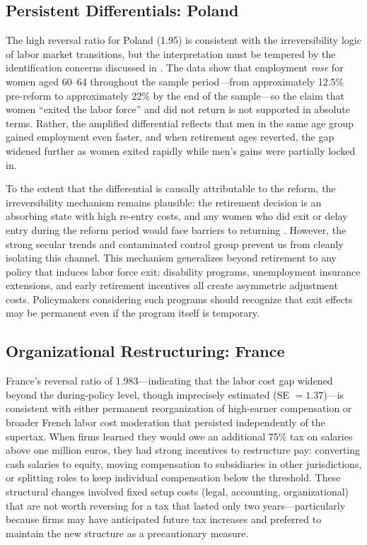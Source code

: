 \documentclass[12pt]{article}
\begin{document}
\subsection{Persistent Differentials: Poland}

The high reversal ratio for Poland (1.95) is consistent with the irreversibility logic of labor market transitions, but the interpretation must be tempered by the identification concerns discussed in . The data show that employment \textit{rose} for women aged 60--64 throughout the sample period---from approximately 12.5\% pre-reform to approximately 22\% by the end of the sample---so the claim that women ``exited the labor force'' and did not return is not supported in absolute terms. Rather, the amplified differential reflects that men in the same age group gained employment even faster, and when retirement ages reverted, the gap widened further as women exited rapidly while men's gains were partially locked in.

To the extent that the differential is causally attributable to the reform, the irreversibility mechanism remains plausible: the retirement decision is an absorbing state with high re-entry costs, and any women who did exit or delay entry during the reform period would face barriers to returning \citep{autor2003rise, staubli2013does}. However, the strong secular trends and contaminated control group prevent us from cleanly isolating this channel. This mechanism generalizes beyond retirement to any policy that induces labor force exit: disability programs, unemployment insurance extensions, and early retirement incentives all create asymmetric adjustment costs. Policymakers considering such programs should recognize that exit effects may be permanent even if the program itself is temporary.

\subsection{Organizational Restructuring: France}

France's reversal ratio of 1.983---indicating that the labor cost gap widened beyond the during-policy level, though imprecisely estimated (SE $= 1.37$)---is consistent with either permanent reorganization of high-earner compensation or broader French labor cost moderation that persisted independently of the supertax. When firms learned they would owe an additional 75\% tax on salaries above one million euros, they had strong incentives to restructure pay: converting cash salaries to equity, moving compensation to subsidiaries in other jurisdictions, or splitting roles to keep individual compensation below the threshold. These structural changes involved fixed setup costs (legal, accounting, organizational) that are not worth reversing for a tax that lasted only two years---particularly because firms may have anticipated future tax increases and preferred to maintain the new structure as a precautionary measure.
\end{document}

